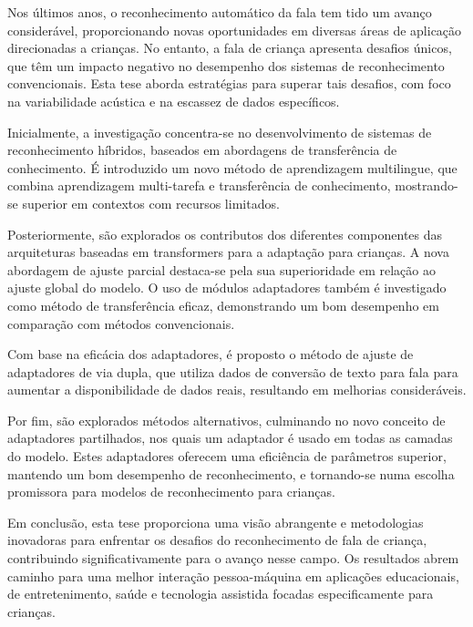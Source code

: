 \acresetall
\noindent Nos últimos anos, o reconhecimento automático da fala tem tido um avanço considerável, proporcionando novas oportunidades em diversas áreas de aplicação direcionadas a crianças. No entanto, a fala de criança apresenta desafios únicos, que têm um impacto negativo no desempenho dos sistemas de reconhecimento convencionais. Esta tese aborda estratégias para superar tais desafios, com foco na variabilidade acústica e na escassez de dados específicos.

Inicialmente, a investigação concentra-se no desenvolvimento de sistemas de reconhecimento híbridos, baseados em abordagens de transferência de conhecimento. É introduzido um novo método de aprendizagem multilingue, que combina aprendizagem multi-tarefa e transferência de conhecimento, mostrando-se superior em contextos com recursos limitados.

Posteriormente, são explorados os contributos dos diferentes componentes das arquiteturas baseadas em transformers para a adaptação para crianças. A nova abordagem de ajuste parcial destaca-se pela sua superioridade em relação ao ajuste global do modelo. O uso de módulos adaptadores também é investigado como método de transferência eficaz, demonstrando um bom desempenho em comparação com métodos convencionais.

Com base na eficácia dos adaptadores, é proposto o método de ajuste de adaptadores de via dupla, que utiliza dados de conversão de texto para fala para aumentar a disponibilidade de dados reais, resultando em melhorias consideráveis.

Por fim, são explorados métodos alternativos, culminando no novo conceito de adaptadores partilhados, nos quais um adaptador é usado em todas as camadas do modelo. Estes adaptadores oferecem uma eficiência de parâmetros superior, mantendo um bom desempenho de reconhecimento, e tornando-se numa escolha promissora para modelos de reconhecimento para crianças.

Em conclusão, esta tese proporciona uma visão abrangente e metodologias inovadoras para enfrentar os desafios do reconhecimento de fala de criança, contribuindo significativamente para o avanço nesse campo. Os resultados abrem caminho para uma melhor interação pessoa-máquina em aplicações educacionais, de entretenimento, saúde e tecnologia assistida focadas especificamente para crianças.

\newpage